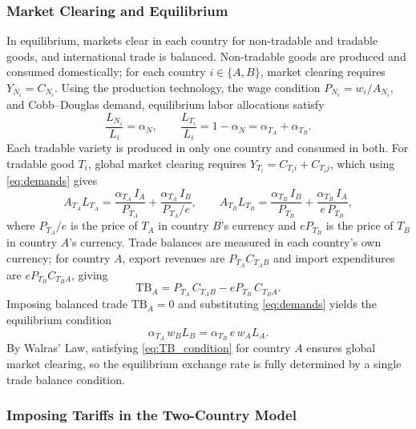 \documentclass[11pt]{article}
\theoremstyle{plain}
\theoremstyle{remark}
\numberwithin{lemma}{section}
\numberwithin{proposition}{section}
\numberwithin{corollary}{section}
\begin{document}
\subsubsection{Market Clearing and Equilibrium}

In equilibrium, markets clear in each country for non-tradable and tradable goods, and international trade is balanced. Non-tradable goods are produced and consumed domestically; for each country $i \in \{A,B\}$, market clearing requires $Y_{N_i} = C_{N_i}$. Using the production technology, the wage condition $P_{N_i} = w_i/A_{N_i}$, and Cobb--Douglas demand, equilibrium labor allocations satisfy
\begin{equation}
\frac{L_{N_i}}{L_i} = \alpha_N, \qquad \frac{L_{T_i}}{L_i} = 1 - \alpha_N = \alpha_{T_A} + \alpha_{T_B}.
\end{equation}
Each tradable variety is produced in only one country and consumed in both. For tradable good $T_i$, global market clearing requires $Y_{T_i} = C_{T_i i} + C_{T_i j}$, which using \eqref{eq:demands} gives
\begin{equation}
A_{T_A} L_{T_A} = \frac{\alpha_{T_A}\, I_A}{P_{T_A}} + \frac{\alpha_{T_A}\, I_B}{P_{T_A}/e}, \qquad
A_{T_B} L_{T_B} = \frac{\alpha_{T_B}\, I_B}{P_{T_B}} + \frac{\alpha_{T_B}\, I_A}{e\, P_{T_B}},
\label{eq:T_world_clearing}
\end{equation}
where $P_{T_A}/e$ is the price of $T_A$ in country $B$'s currency and $eP_{T_B}$ is the price of $T_B$ in country $A$'s currency. Trade balances are measured in each country's own currency; for country $A$, export revenues are $P_{T_A} C_{T_A B}$ and import expenditures are $eP_{T_B} C_{T_B A}$, giving
\begin{equation}
\mathrm{TB}_A = P_{T_A}\, C_{T_A B} - e P_{T_B}\, C_{T_B A}.
\label{eq:TB}
\end{equation}
Imposing balanced trade $\mathrm{TB}_A = 0$ and substituting \eqref{eq:demands} yields the equilibrium condition
\begin{equation}
\alpha_{T_A}\, w_B L_B = \alpha_{T_B}\, e\, w_A L_A.
\label{eq:TB_condition}
\end{equation}
By Walras' Law, satisfying \eqref{eq:TB_condition} for country $A$ ensures global market clearing, so the equilibrium exchange rate is fully determined by a single trade balance condition.

\subsubsection{Imposing Tariffs in the Two-Country Model}
\label{sec:tariffs}
\end{document}
